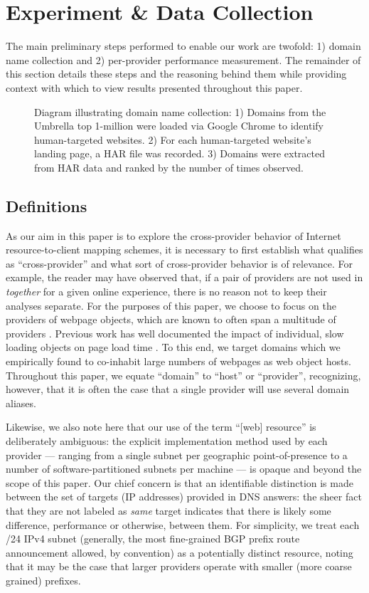 \section{Experiment \& Data Collection} \label{oversky}

The main preliminary steps performed to enable our
work are twofold: 1) domain name collection and 2) per-provider performance
measurement. The
remainder of this section details these steps and the reasoning behind them
while providing context with which to view results presented throughout this paper. 

\begin{figure}
    \caption{Diagram illustrating domain name collection: 1) Domains from the Umbrella top 1-million were loaded via Google Chrome to identify human-targeted websites. 2) For each human-targeted website's landing page, a HAR file was recorded. 3) Domains were extracted from HAR data and ranked by the number of times observed.
    }
    \label{fig:domfind}
\end{figure}

\subsection{Definitions}

As our aim in this paper is to explore the cross-provider behavior of Internet
resource-to-client mapping schemes, it is necessary to first establish what
qualifies as ``cross-provider'' and what sort of cross-provider behavior is of
relevance. For example, the reader may have observed that, if a pair of
providers are not used in \emph{together} for a given online experience, there
is no reason not to keep their analyses separate. For the purposes of this
paper, we choose to focus on the providers of webpage objects, which are known
to often span a multitude of providers \cite{butkiewicz2011}. Previous work has well documented
the impact of individual, slow loading objects on page load time \cite{wang2013}. To this
end, we target domains which we empirically found to co-inhabit large numbers of
webpages as web object hosts. Throughout this paper, we equate ``domain'' to
``host'' or ``provider'', recognizing, however, that it is often the case that a
single provider will use several domain aliases. 

Likewise, we also note here that our use of the term ``[web] resource'' is
deliberately ambiguous: the explicit implementation method used by each provider
--- ranging from a single subnet per geographic point-of-presence to a number of
software-partitioned subnets per machine --- is opaque and beyond the scope of
this paper. Our chief concern is that an identifiable distinction is made
between the set of targets (IP addresses) provided in DNS answers: the sheer fact that they are not
labeled as \emph{same} target indicates that there is likely some difference,
performance or otherwise, between them. For simplicity, we treat
each /24 IPv4 subnet (generally, the most fine-grained BGP prefix route
announcement allowed, by convention) as a potentially distinct resource, noting
that it may be the case that larger providers operate with smaller (more coarse
grained) prefixes.

